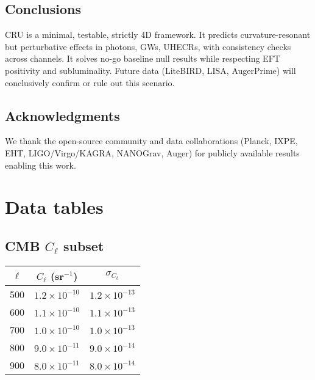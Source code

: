 \documentclass[%
 reprint,
 amsmath,amssymb,
 aps,
 pra,
 longbibliography,
 nofootinbib
]{revtex4-2}
\begin{document}
\section{Conclusions}
\label{sec:concl}

CRU is a minimal, testable, strictly 4D framework.  
It predicts curvature-resonant but perturbative effects in photons, GWs, UHECRs, with consistency checks across channels.  
It solves no-go baseline null results while respecting EFT positivity and subluminality.  
Future data (LiteBIRD, LISA, AugerPrime) will conclusively confirm or rule out this scenario.

\section*{Acknowledgments}
We thank the open-source community and data collaborations (Planck, IXPE, EHT, LIGO/Virgo/KAGRA, NANOGrav, Auger) for publicly available results enabling this work.

\appendix
\chapter{Data tables}
\label{app:data}

\section{CMB $C_\ell$ subset}
\begin{table}[h]
\centering
\begin{tabular}{c c c}
\toprule
$\ell$ & $C_\ell$ (sr$^{-1}$) & $\sigma_{C_\ell}$ \\
\midrule
500 & $1.2\times10^{-10}$ & $1.2\times10^{-13}$ \\
600 & $1.1\times10^{-10}$ & $1.1\times10^{-13}$ \\
700 & $1.0\times10^{-10}$ & $1.0\times10^{-13}$ \\
800 & $9.0\times10^{-11}$ & $9.0\times10^{-14}$ \\
900 & $8.0\times10^{-11}$ & $8.0\times10^{-14}$ \\
\bottomrule
\end{tabular}
\end{table}
\end{document}
